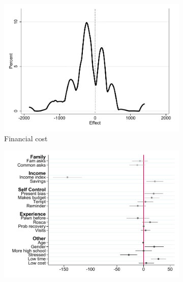 \documentclass[11pt]{article}
\begin{document}
\begin{figure}[H]
    \caption{Heterogeneous Treatment Effect - NoChoice/Fee}
    \label{heterogeneous_te_3}
    \begin{center}
    \begin{subfigure}{0.4\textwidth}
        \caption{Financial cost}
        \centering
        \includegraphics[width=\textwidth]{Figuras/he_dist_fc_admin_disc_pro_2.pdf}
    \end{subfigure}
    \begin{subfigure}{0.4\textwidth}
        \caption*{}
        \centering
        \includegraphics[width=\textwidth]{Figuras/HE/he_int_vertical_fc_admin_disc_pro_2.pdf}
    \end{subfigure}
    

\end{center}
\end{figure}
\end{document}

